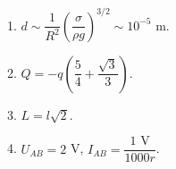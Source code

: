 \documentclass[14pt]{article}
\begin{document}
\begin{LARGE}

1. $d\sim \dfrac{1}{R^2}\left(\dfrac{\sigma}{\rho g}\right)^{3/2}\sim 10^{-5}$ m.

2. $Q=-q\left(\dfrac{5}{4}+\dfrac{\sqrt3}{3}\right)$.

3. $L=l\sqrt2$.

4. $U_{AB}=2$ V, $I_{AB}=\dfrac{1\text{ V}}{1000r}$.

\end{LARGE}
\end{document}
